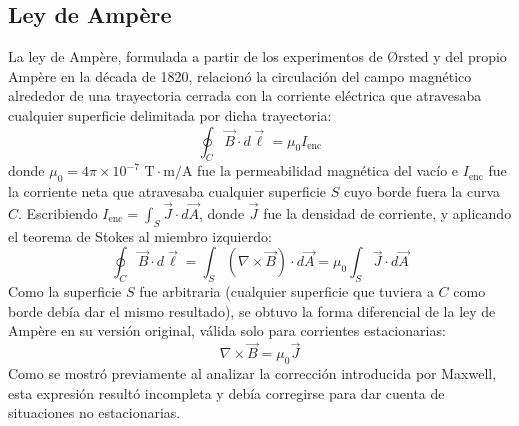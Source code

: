 \subsection{Ley de Ampère}
La ley de Ampère, formulada a partir de los experimentos de Ørsted y del propio Ampère en la década de 1820, relacionó la circulación del campo magnético alrededor de una trayectoria cerrada con la corriente eléctrica que atravesaba cualquier superficie delimitada por dicha trayectoria:
\begin{equation}
    \oint_C \vec{B} \cdot d\vec{\ell} = \mu_0 I_{\text{enc}}
\end{equation}
donde $\mu_0 = 4\pi \times 10^{-7} \text{ T}\cdot\text{m/A}$ fue la permeabilidad magnética del vacío e $I_{\text{enc}}$ fue la corriente neta que atravesaba cualquier superficie $S$ cuyo borde fuera la curva $C$. Escribiendo $I_{\text{enc}} = \int_S \vec{J} \cdot d\vec{A}$, donde $\vec{J}$ fue la densidad de corriente, y aplicando el teorema de Stokes al miembro izquierdo:
\begin{equation}
    \oint_C \vec{B} \cdot d\vec{\ell} = \int_S (\nabla \times \vec{B}) \cdot d\vec{A} = \mu_0 \int_S \vec{J} \cdot d\vec{A}
\end{equation}
Como la superficie $S$ fue arbitraria (cualquier superficie que tuviera a $C$ como borde debía dar el mismo resultado), se obtuvo la forma diferencial de la ley de Ampère en su versión original, válida solo para corrientes estacionarias:
\begin{equation}
    \nabla \times \vec{B} = \mu_0 \vec{J}
\end{equation}
Como se mostró previamente al analizar la corrección introducida por Maxwell, esta expresión resultó incompleta y debía corregirse para dar cuenta de situaciones no estacionarias.

